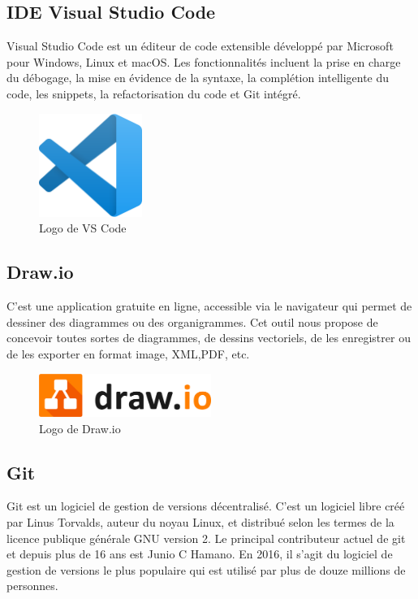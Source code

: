 \documentclass[french]{report}
\begin{document}
\subsection{IDE Visual Studio Code}

Visual Studio Code est un éditeur de code extensible développé par Microsoft
pour Windows, Linux et macOS. Les fonctionnalités incluent la prise en charge du
débogage, la mise en évidence de la syntaxe, la complétion intelligente du code,
les snippets, la refactorisation du code et Git intégré. \cite{ide}

\begin{figure}[H]
    \centering
    \includegraphics[width=0.3\textwidth]{images/1024px-Visual_Studio_Code_1.35_icon.svg.png}
    \caption{Logo de VS Code}
    \label{fig:my_label}
\end{figure}

\subsection{Draw.io}

C'est une application gratuite en ligne, accessible via le navigateur qui permet
de dessiner des diagrammes ou des organigrammes. Cet outil nous propose de
concevoir toutes sortes de diagrammes, de dessins vectoriels, de les enregistrer
ou de les exporter en format image, XML,PDF, etc.

\begin{figure}[H]
    \centering
    \includegraphics[width=0.5\textwidth]{images/drawio.jpg}
    \caption{Logo de Draw.io}
    \label{fig:my_label}
\end{figure}

\subsection{Git}

Git est un logiciel de gestion de versions décentralisé. C'est un logiciel libre
créé par Linus Torvalds, auteur du noyau Linux, et distribué selon les termes de
la licence publique générale GNU version 2. Le principal contributeur actuel de
git et depuis plus de 16 ans est Junio C Hamano. En 2016, il s'agit du logiciel
de gestion de versions le plus populaire qui est utilisé par plus de douze
millions de personnes.
\end{document}
